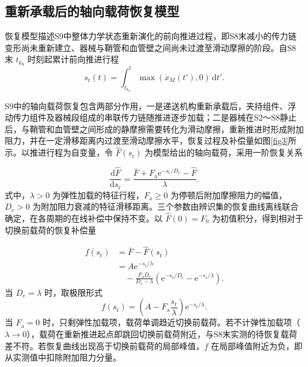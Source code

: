 \documentclass{JQR_LaTeX_Template-0507/JQRnew}
\providecommand{\RevisionColor}{\color{black}}
\newcommand{\revbegin}{\begingroup\RevisionColor}
\newcommand{\revend}{\par\endgroup}
\begin{document}
\subsection{重新承载后的轴向载荷恢复模型}

恢复模型描述S9中整体力学状态重新演化的前向推进过程，即S8末减小的传力链变形尚未重新建立、器械与鞘管和血管壁之间尚未过渡至滑动摩擦的阶段。自S8末 $t_{k_9}$ 时刻起累计前向推进行程
\begin{equation}
\label{eq:recovery-travel}
s_{\mathrm r}(t)=\int_{t_{k_9}}^{t}
\max\!\left(\dot x_M(t'),0\right)\,\mathrm dt'.
\end{equation}
\revbegin

S9中的轴向载荷恢复包含两部分作用，一是递送机构重新承载后，夹持组件、浮动传力组件及器械段组成的串联传力链随推进逐步加载；二是器械在S2～S8静止后，与鞘管和血管壁之间形成的静摩擦需要转化为滑动摩擦，重新推进时形成附加阻力，并在一定滑移距离内过渡至滑动摩擦水平，恢复过程及补偿量如图\ref{fig3}所示。以推进行程为自变量，令 $\hat F(s_{\mathrm r})$ 为模型给出的轴向载荷，采用一阶恢复关系
\revend
\begin{equation}
\label{eq:recovery-ode}
\frac{\mathrm d\hat F}{\mathrm ds_{\mathrm r}}
=\frac{\bar F+F_{\mathrm a}\mathrm e^{-s_{\mathrm r}/D_c}-\hat F}{\lambda}.
\end{equation}
\revbegin
式中，$\lambda>0$ 为弹性加载的特征行程，$F_{\mathrm a}\ge0$ 为停顿后附加摩擦阻力的幅值，$D_c>0$ 为附加阻力衰减的特征滑移距离。三个参数由辨识集的恢复曲线离线联合确定，在各周期的在线补偿中保持不变。以 $\hat F(0)=F_0$ 为初值积分，得到相对于切换前载荷的恢复补偿量
\revend
\begin{equation}
\label{eq:recovery-comp}
\begin{aligned}
f(s_{\mathrm r})&=\bar F-\hat F(s_{\mathrm r})\\
&=A\mathrm e^{-s_{\mathrm r}/\lambda}\\
&\quad-\frac{F_{\mathrm a}D_c}{D_c-\lambda}
\left(\mathrm e^{-s_{\mathrm r}/D_c}-\mathrm e^{-s_{\mathrm r}/\lambda}\right).
\end{aligned}
\end{equation}
当 $D_c=\lambda$ 时，取极限形式
\begin{equation}
\label{eq:equal-scales}
f(s_{\mathrm r})=
\left(A-F_{\mathrm a}\frac{s_{\mathrm r}}{\lambda}\right)\mathrm e^{-s_{\mathrm r}/\lambda}.
\end{equation}
\revbegin
当 $F_{\mathrm a}=0$ 时，只剩弹性加载项，载荷单调趋近切换前载荷。若不计弹性加载项（$\lambda\to0$），载荷在重新推进起点即跳回切换前载荷附近，与S8末实测的待恢复载荷差不符。若恢复曲线出现高于切换前载荷的局部峰值，$f$ 在局部峰值附近为负，即从实测值中扣除附加阻力分量。
\revend
\end{document}
